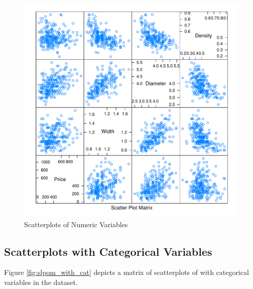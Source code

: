 \begin{figure}[h!]
  \centering
  \includegraphics[scale = 0.5, keepaspectratio=true]{../Figures/slpom_num_only}
  \caption{Scatterplots of Numeric Variables} \label{fig:slpom_num_only}
\end{figure}


\pagebreak
\subsection{Scatterplots with Categorical Variables}

Figure \ref{fig:slpom_with_cat} depicts a matrix of scatterplots
of with categorical variables in the dataset.

